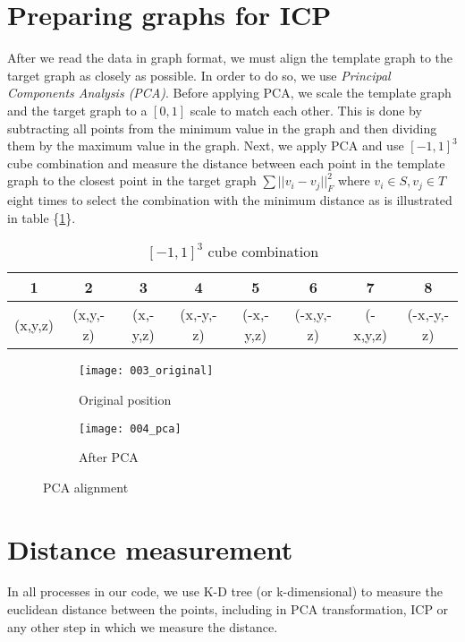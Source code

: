 \documentclass[../structure.tex]{subfiles}
\begin{document}
\section{Preparing graphs for ICP}
After we read the data in graph format, we must align the template graph to the target graph as closely as possible. In order to do so, we use \textit{Principal Components Analysis (PCA)}. Before applying PCA, we scale the template graph and the target graph to a $[0,1]$ scale to match each other. This is done by subtracting all points from the minimum value in the graph and then dividing them by the maximum value in the graph. Next, we apply PCA and use $[-1,1]^3$ cube combination and measure the distance between each point in the template graph to the closest point in the target graph $\sum ||v_i-v_j||_F^2$ where $v_i \in S, v_j \in T$ eight times to select the combination with the minimum distance as is illustrated in table \{\ref{table:cube}\}.
\begin{center}
\begin{table}[h]
	\begin{tabular}{| c | c | c | c | c | c | c | c |}
	\hline
	1 & 2 & 3 & 4 & 5 & 6 & 7 & 8\\
	\hline
	(x,y,z) & (x,y,-z) & (x,-y,z) & (x,-y,-z) & (-x,-y,z) & (-x,y,-z) & (-x,y,z) & (-x,-y,-z)\\
	\hline
	\end{tabular}
\caption{$[-1,1]^3$ cube combination}
\label{table:cube}
\end{table}
\end{center}

\begin{figure}[h!]
	\centering
	\begin{subfigure}[b]{0.59\textwidth}
	\texttt{[image: 003\_original]}
	\caption{Original position}
	\end{subfigure}
	\begin{subfigure}[b]{0.39\textwidth}
	\texttt{[image: 004\_pca]}
	\caption{After PCA}
	\end{subfigure}
\label{fig:pca}
\caption{PCA alignment}
\end{figure}

\section{Distance measurement}
In all processes in our code, we use K-D tree (or k-dimensional) to measure the euclidean distance between the points, including in PCA transformation, ICP or any other step in which we measure the distance.
\end{document}
